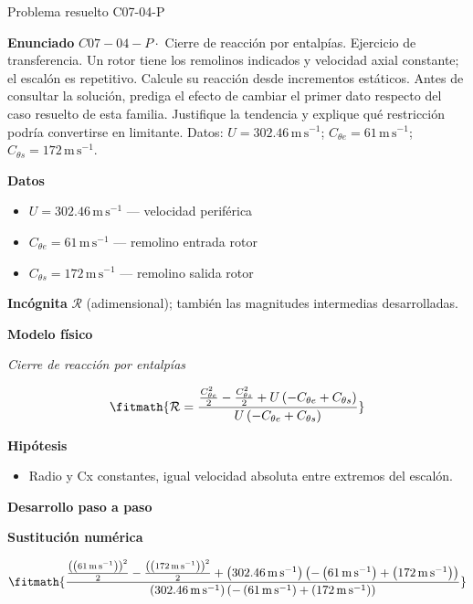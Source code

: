 \documentclass[10pt,openany]{book}
\begin{document}
\begin{studiumworked}{Problema resuelto C07-04-P}


\noindent\textbf{Enunciado}
\(C07-04-P \cdot\) Cierre de reacción por entalpías. Ejercicio de transferencia. Un rotor tiene los remolinos indicados y velocidad axial constante; el escalón es repetitivo. Calcule su reacción desde incrementos estáticos. Antes de consultar la solución, prediga el efecto de cambiar el primer dato respecto del caso resuelto de esta familia. Justifique la tendencia y explique qué restricción podría convertirse en limitante. Datos: \(U=302.46\, \mathrm{m}\,\mathrm{s}^{-1}\); \(C_{\theta e}=61\, \mathrm{m}\,\mathrm{s}^{-1}\); \(C_{\theta s}=172\, \mathrm{m}\,\mathrm{s}^{-1}\).

\noindent\textbf{Datos}
\begin{itemize}
\item $U = 302.46\,\mathrm{m}\,\mathrm{s}^{-1}$ — velocidad periférica
\item $C_{\theta e} = 61\,\mathrm{m}\,\mathrm{s}^{-1}$ — remolino entrada rotor
\item $C_{\theta s} = 172\,\mathrm{m}\,\mathrm{s}^{-1}$ — remolino salida rotor
\end{itemize}

\noindent\textbf{Incógnita}
$\mathcal{R}$ (adimensional); también las magnitudes intermedias desarrolladas.

\noindent\textbf{Modelo físico}

\noindent\textit{Cierre de reacción por entalpías}

\[
\fitmath{\mathcal R=\frac{\frac{C_{\theta e}^{2}}{2} - \frac{C_{\theta s}^{2}}{2} + U \left(- C_{\theta e} + C_{\theta s}\right)}{U \left(- C_{\theta e} + C_{\theta s}\right)}}
\]

\noindent\textbf{Hipótesis}
\begin{itemize}
\item Radio y Cx constantes, igual velocidad absoluta entre extremos del escalón.
\end{itemize}

\noindent\textbf{Desarrollo paso a paso}



\noindent\textbf{Sustitución numérica}

\[
\fitmath{\frac{\frac{\left(\left(61\,\mathrm{m}\,\mathrm{s}^{-1}\right)\right)^{2}}{2} - \frac{\left(\left(172\,\mathrm{m}\,\mathrm{s}^{-1}\right)\right)^{2}}{2} + \left(302.46\,\mathrm{m}\,\mathrm{s}^{-1}\right) \left(- \left(61\,\mathrm{m}\,\mathrm{s}^{-1}\right) + \left(172\,\mathrm{m}\,\mathrm{s}^{-1}\right)\right)}{\left(302.46\,\mathrm{m}\,\mathrm{s}^{-1}\right) \left(- \left(61\,\mathrm{m}\,\mathrm{s}^{-1}\right) + \left(172\,\mathrm{m}\,\mathrm{s}^{-1}\right)\right)}}
\]


\end{studiumworked}
\end{document}
